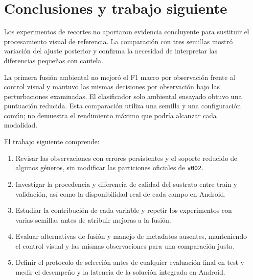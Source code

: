 \documentclass[11pt,a4paper]{article}
\begin{document}
\section{Conclusiones y trabajo siguiente}
Los experimentos de recortes no aportaron evidencia concluyente para sustituir
el procesamiento visual de referencia. La comparación con tres semillas
mostró variación del ajuste posterior y confirma la necesidad de interpretar
las diferencias pequeñas con cautela.

La primera fusión ambiental no mejoró el F1 macro por observación frente al
control visual y mantuvo las mismas decisiones por observación bajo las
perturbaciones examinadas. El clasificador solo ambiental ensayado obtuvo una
puntuación reducida. Esta comparación utiliza una semilla y una configuración
común; no demuestra el rendimiento máximo que podría alcanzar cada modalidad.

El trabajo siguiente comprende:
\begin{enumerate}
\item Revisar las observaciones con errores persistentes y el soporte reducido
de algunos géneros, sin modificar las particiones oficiales de \texttt{v002}.
\item Investigar la procedencia y diferencia de calidad del sustrato entre
train y validación, así como la disponibilidad real de cada campo en Android.
\item Estudiar la contribución de cada variable y repetir los experimentos
con varias semillas antes de atribuir mejoras a la fusión.
\item Evaluar alternativas de fusión y manejo de metadatos ausentes, manteniendo
el control visual y las mismas observaciones para una comparación justa.
\item Definir el protocolo de selección antes de cualquier evaluación final en
test y medir el desempeño y la latencia de la solución integrada en Android.
\end{enumerate}
\end{document}
